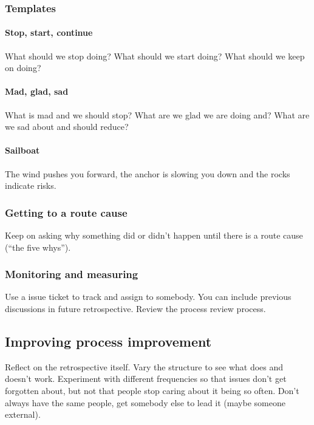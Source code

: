 \subsubsection{Templates}\label{ssub:templates}

\paragraph{Stop, start, continue}\label{par:stop_start_continue}

What should we stop doing? What should we start doing? What should we keep on doing?

\paragraph{Mad, glad, sad}\label{par:mad_glad_sad}

What is mad and we should stop? What are we glad we are doing and? What are we sad about and should reduce?

\paragraph{Sailboat}\label{par:sailboat}

The wind pushes you forward, the anchor is slowing you down and the rocks indicate risks.

\subsubsection{Getting to a route cause}\label{ssub:getting_to_a_route_cause}

Keep on asking why something did or didn't happen until there is a route cause (``the five whys'').

\subsubsection{Monitoring and measuring}\label{ssub:monitoring_and_measuring}

Use a issue ticket to track and assign to somebody.
You can include previous discussions in future retrospective.
Review the process review process.

\subsection{Improving process improvement}\label{sub:improving_process_improvement}

Reflect on the retrospective itself.
Vary the structure to see what does and doesn't work.
Experiment with different frequencies so that issues don't get forgotten about, but not that people stop caring about it being so often.
Don't always have the same people, get somebody else to lead it (maybe someone external).
